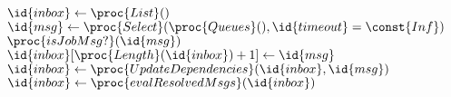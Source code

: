 \begin{codebox}
	\li \(\id{inbox} \gets \proc{List}()\)
	\li \Repeat
	\li \(\id{msg} \gets \proc{Select}(\proc{Queues}(), \id{timeout}=\const{Inf})\)
	\li \If \(\proc{isJobMsg?}(\id{msg})\)
	\li \Then
	\(\id{inbox}[\proc{Length}(\id{inbox})+1] \gets \id{msg}\)
	\End
	\li \(\id{inbox} \gets \proc{UpdateDependencies}(\id{inbox},\id{msg})\)
	\li \(\id{inbox} \gets \proc{evalResolvedMsgs}(\id{inbox})\)
\end{codebox}
